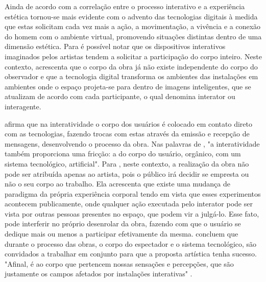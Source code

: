Ainda de acordo com  a correlação entre o processo interativo e a experiência estética tornou-se mais evidente com o advento das tecnologias digitais à medida que estas solicitam cada vez mais a ação, a movimentação, a vivência e a conexão do homem com o ambiente virtual, promovendo situações distintas dentro de uma dimensão estética. Para  é possível notar que os dispositivos interativos imaginados pelos artistas tendem a solicitar a participação do corpo inteiro. Neste contexto,  acrescenta que o corpo da obra já não existe independente do corpo do observador e que a tecnologia digital transforma os ambientes das instalações em ambientes onde o espaço projeta-se para dentro de imagens inteligentes, que se atualizam de acordo com cada participante, o qual denomina interator ou interagente.

 afirma que na interatividade o corpo dos usuários é colocado em contato direto com as tecnologias, fazendo trocas com estas através da emissão e recepção de mensagens, desenvolvendo o processo da obra. Nas palavras de , "a interatividade também proporciona uma fricção: a do corpo do usuário, orgânico, com um sistema tecnológico, artificial". Para , neste contexto, a realização da obra não pode ser atribuída apenas ao artista, pois o público irá decidir se empresta ou não o seu corpo ao trabalho. Ela acrescenta que existe uma mudança de paradigma da própria experiência corporal tendo em vista que esses experimentos acontecem publicamente, onde qualquer ação executada pelo interator pode ser vista por outras pessoas presentes no espaço, que podem vir a julgá-lo. Esse fato, pode interferir no próprio desenrolar da obra, fazendo com que o usuário se dedique mais ou menos a participar efetivamente da mesma.  concluem que durante o processo das obras, o corpo do espectador e o sistema tecnológico, são convidados a trabalhar em conjunto para que a proposta artística tenha sucesso. "Afinal, é ao corpo que pertencem nossas sensações e percepções, que são justamente os campos afetados por instalações interativas"  \cite[p. 199]{witt}.
